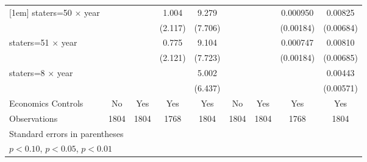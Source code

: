 {\begin{longtable}{l*{8}{c}}
[1em]
staters=50 $\times$ year&                     &                     &       1.004         &       9.279         &                     &                     &    0.000950         &     0.00825         \\
                    &                     &                     &     (2.117)         &     (7.706)         &                     &                     &   (0.00184)         &   (0.00684)         \\
[1em]
staters=51 $\times$ year&                     &                     &       0.775         &       9.104         &                     &                     &    0.000747         &     0.00810         \\
                    &                     &                     &     (2.121)         &     (7.723)         &                     &                     &   (0.00184)         &   (0.00685)         \\
[1em]
staters=8 $\times$ year&                     &                     &                     &       5.002         &                     &                     &                     &     0.00443         \\
                    &                     &                     &                     &     (6.437)         &                     &                     &                     &   (0.00571)         \\
[1em]
Economics Controls  &          No         &         Yes         &         Yes         &         Yes         &          No         &         Yes         &         Yes         &         Yes         \\
\hline
Observations        &        1804         &        1804         &        1768         &        1804         &        1804         &        1804         &        1768         &        1804         \\
\hline\hline
\multicolumn{9}{l}{\footnotesize Standard errors in parentheses}\\
\multicolumn{9}{l}{\footnotesize \sym{*} \(p<0.10\), \sym{**} \(p<0.05\), \sym{***} \(p<0.01\)}\\
\end{longtable}
}
